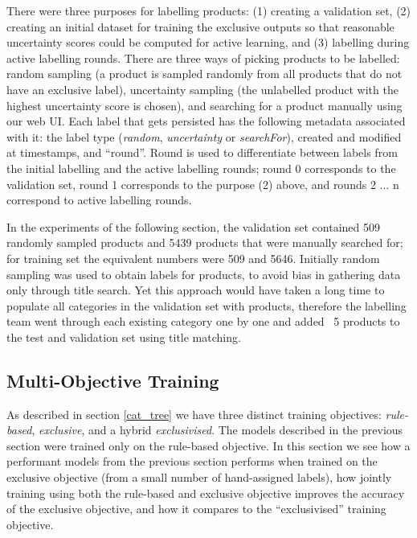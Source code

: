There were three purposes for labelling products: (1) creating a validation set, (2) creating an initial dataset for training the exclusive outputs so that reasonable uncertainty scores could be computed for active learning, and (3) labelling during active labelling rounds.
There are three ways of picking products to be labelled: random sampling (a product is sampled randomly from all products that do not have an exclusive label), uncertainty sampling (the unlabelled product with the highest uncertainty score is chosen), and searching for a product manually using our web UI.
Each label that gets persisted has the following metadata associated with it: the label type (\textit{random}, \textit{uncertainty} or \textit{searchFor}), created and modified at timestamps, and ``round''.
Round is used to differentiate between labels from the initial labelling and the active labelling rounds; round 0 corresponds to the validation set, round 1 corresponds to the purpose (2) above, and rounds 2 ... n correspond to active labelling rounds.

In the experiments of the following section, the validation set contained 509 randomly sampled products and 5439 products that were manually searched for; for training set the equivalent numbers were 509 and 5646.
Initially random sampling was used to obtain labels for products, to avoid bias in gathering data only through title search.
Yet this approach would have taken a long time to populate all categories in the validation set with products, therefore the labelling team went through each existing category one by one and added ~5 products to the test and validation set using title matching.

\subsection{Multi-Objective Training}
\label{multiobj}

As described in section \ref{cat_tree} we have three distinct training objectives: \textit{rule-based}, \textit{exclusive}, and a hybrid \textit{exclusivised}.
The models described in the previous section were trained only on the rule-based objective.
In this section we see how a performant models from the previous section performs when trained on the exclusive objective (from a small number of hand-assigned labels), how jointly training using both the rule-based and exclusive objective improves the accuracy of the exclusive objective, and how it compares to the ``exclusivised'' training objective.

